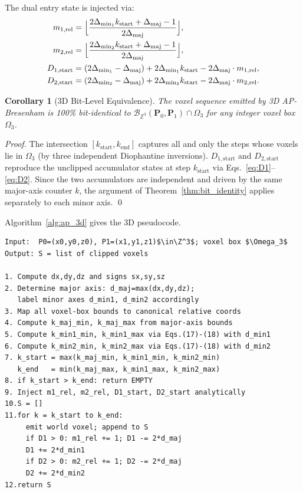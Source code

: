 \documentclass[12pt,a4paper]{article}
\newtheorem{corollary}[theorem]{Corollary}
\theoremstyle{definition}
\newcommand{\Z}{\mathbb{Z}}
\newcommand{\Zth}{\mathbb{Z}^3}
\newcommand{\Bresen}{\mathcal{B}}
\newcommand{\dmaj}{\Delta_{\mathrm{maj}}}
\newcommand{\dmin}[1]{\Delta_{\mathrm{min}_{#1}}}
\newcommand{\kst}{k_{\mathrm{start}}}
\newcommand{\ken}{k_{\mathrm{end}}}
\begin{document}
The dual entry state is injected via:
\begin{align}
  m_{1,\mathrm{rel}} &= \Bigl\lfloor
    \frac{2\dmin{1}\kst + \dmaj - 1}{2\dmaj}\Bigr\rfloor,\\
  m_{2,\mathrm{rel}} &= \Bigl\lfloor
    \frac{2\dmin{2}\kst + \dmaj - 1}{2\dmaj}\Bigr\rfloor,\\
  D_{1,\mathrm{start}} &= (2\dmin{1} - \dmaj)
    + 2\dmin{1}\kst - 2\dmaj\cdot m_{1,\mathrm{rel}},\\
  D_{2,\mathrm{start}} &= (2\dmin{2} - \dmaj)
    + 2\dmin{2}\kst - 2\dmaj\cdot m_{2,\mathrm{rel}}.
\end{align}

\begin{corollary}[3D Bit-Level Equivalence]
\label{cor:3d_bit_identity}
The voxel sequence emitted by 3D AP-Bresenham is 100\%
bit-identical to
$\Bresen_{\Zth}(\mathbf{P}_0,\mathbf{P}_1) \cap \Omega_3$
for any integer voxel box~$\Omega_3$.
\end{corollary}

\begin{proof}
The intersection $[\kst, \ken]$ captures all and only the
steps whose voxels lie in $\Omega_3$ (by three independent
Diophantine inversions). $D_{1,\mathrm{start}}$ and
$D_{2,\mathrm{start}}$ reproduce the unclipped accumulator
states at step $\kst$ via Eqs.~\eqref{eq:D1}--\eqref{eq:D2}.
Since the two accumulators are independent and driven by
the same major-axis counter $k$, the argument of
Theorem~\ref{thm:bit_identity} applies separately to each
minor axis. \qed
\end{proof}

Algorithm~\ref{alg:ap_3d} gives the 3D pseudocode.

\begin{algorithm}[tb]
\caption{AP-Bresenham 3D Voxel Clipping}
\label{alg:ap_3d}
\begin{lstlisting}[style=pseudo,caption={}]
Input:  P0=(x0,y0,z0), P1=(x1,y1,z1)$\in\Z^3$; voxel box $\Omega_3$
Output: S = list of clipped voxels

1. Compute dx,dy,dz and signs sx,sy,sz
2. Determine major axis: d_maj=max(dx,dy,dz);
   label minor axes d_min1, d_min2 accordingly
3. Map all voxel-box bounds to canonical relative coords
4. Compute k_maj_min, k_maj_max from major-axis bounds
5. Compute k_min1_min, k_min1_max via Eqs.(17)-(18) with d_min1
6. Compute k_min2_min, k_min2_max via Eqs.(17)-(18) with d_min2
7. k_start = max(k_maj_min, k_min1_min, k_min2_min)
   k_end   = min(k_maj_max, k_min1_max, k_min2_max)
8. if k_start > k_end: return EMPTY
9. Inject m1_rel, m2_rel, D1_start, D2_start analytically
10.S = []
11.for k = k_start to k_end:
     emit world voxel; append to S
     if D1 > 0: m1_rel += 1; D1 -= 2*d_maj
     D1 += 2*d_min1
     if D2 > 0: m2_rel += 1; D2 -= 2*d_maj
     D2 += 2*d_min2
12.return S
\end{lstlisting}
\end{algorithm}
\end{document}
